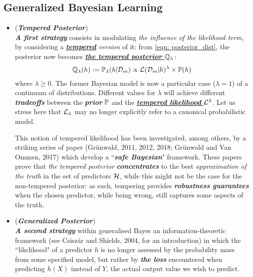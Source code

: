 \documentclass[11pt]{article}
\begin{document}
\subsection{Generalized Bayesian Learning}
\begin{itemize}
\item \begin{remark}(\textbf{\emph{Tempered Posterior}}) \citep{guedj2019primer}\\
\emph{\textbf{A first strategy}} consists in modulating \emph{the influence of the likelihood term}, by considering a \emph{\underline{\textbf{tempered}} version} of it: from \eqref{eqn: posterior_dist}, the posterior now becomes \emph{\underline{\textbf{the tempered posterior ${\mathbb Q}_{\lambda}$}}}:
\begin{align}
{\mathbb Q}_{\lambda}(h) := {\mathbb P}_{\lambda}(h | {\mathcal D}_m) \propto {\mathcal L}({\mathcal D}_m | h)^{\lambda} \times {\mathbb P}(h) \label{eqn: tempered_posterior_dist}
\end{align} where $\lambda \ge 0$. The former Bayesian model is now a particular case ($\lambda = 1$) of a continuum of distributions. Different values for $\lambda$ will achieve different \emph{\textbf{tradeoffs}} between the \emph{\textbf{prior}} ${\mathbb P}$ and the \underline{\emph{\textbf{tempered likelihood}} ${\mathcal L}^{\lambda}$}. Let us stress here that ${\mathcal L}_{\lambda}$ may no longer explicitly refer to a canonical probabilistic model.

This notion of tempered likelihood has been investigated, among others, by a striking series of paper (Grünwald, 2011, 2012, 2018; Grünwald and Van Ommen, 2017)
which develop a ``\emph{\textbf{safe Bayesian}}" framework. These papers prove that \emph{the tempered posterior} \emph{\textbf{concentrates}} to the best \emph{approximation of the truth} in the set of predictors ${\mathcal H}$, while this might not be the case for the non-tempered posterior: as such, tempering provides \emph{\textbf{robustness guarantees}} when the chosen predictor, while being wrong, still captures some aspects of the truth.
\end{remark}

\item \begin{remark}(\textbf{\emph{Generalized Posterior}}) \citep{guedj2019primer}\\
\emph{\textbf{A second strategy}} within generalised Bayes an information-theoretic framework (see Csiszár and Shields, 2004, for an introduction) in which the ``likelihood" of a predictor $h$ is no longer assessed by the probability mass from some specified model, but rather by \emph{\textbf{the loss}} encountered when
predicting $h(X)$ instead of $Y$, the actual output value we wish to predict.


\end{remark}
\end{itemize}
\end{document}
